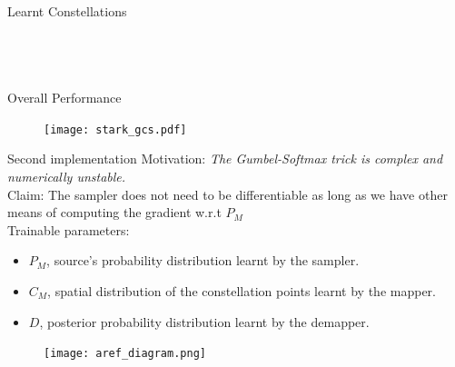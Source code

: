 \documentclass[english,aspectratio=1610,9pt,helvet,nicetitles]{ICEbeamerTUMCD}
\begin{document}
\begin{frame}{Learnt Constellations}
\begin{columns}[T,onlytextwidth]
		\begin{column}{.5\textwidth}
        \begin{figure}[h]
		    
		    \label{subfig:stark5dB}
		    \\
	        
	        \label{subfig:stark18dB}
		    \label{fig:starkMASK}
		\end{figure}
        \end{column}
        \begin{column}{.5\textwidth}
        \begin{figure}[h]
		    
		    \label{subfig:stark5dB}
		    \\
	        
	        \label{subfig:stark18dB}
		    \label{fig:starkMASK}
		\end{figure}
        \end{column}
\end{columns}
\end{frame}

\begin{frame}{Overall Performance}
\begin{figure}[H]
	\centering
	\texttt{[image: stark\_gcs.pdf]}
    \label{fig:starkPerf}
\end{figure}
\end{frame}

\begin{frame}{Second implementation \cite{Aref}}
	Motivation:	\textit{The Gumbel-Softmax trick is complex and numerically unstable.\\}
	Claim: The sampler does not need to be differentiable as long as we have other means of computing the gradient w.r.t $P_M$\\
	Trainable parameters:
	\vspace{-5mm}
	\begin{itemize}
		\item $P_M$, source's probability distribution learnt by the sampler.
		\item $C_M$, spatial distribution of the constellation points learnt by the mapper.
		\item $D$, posterior probability distribution learnt by the demapper.
	\end{itemize}
	
    \begin{figure}
		\centering
		\texttt{[image: aref\_diagram.png]}
		\label{fig:arefAe}
	\end{figure}
\end{frame}
\end{document}

